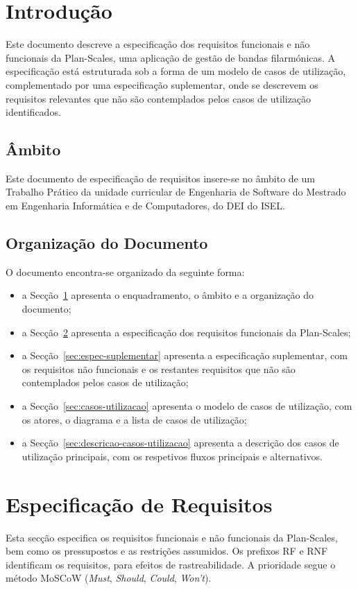 


\section{Introdução}
\label{sec:introducao}
Este documento descreve a especificação dos requisitos funcionais e não funcionais da Plan-Scales, uma aplicação de gestão de bandas filarmónicas. A especificação está estruturada sob a forma de um modelo de casos de utilização, complementado por uma especificação suplementar, onde se descrevem os requisitos relevantes que não são contemplados pelos casos de utilização identificados.

\subsection{Âmbito}
Este documento de especificação de requisitos insere-se no âmbito de um Trabalho Prático da unidade curricular de Engenharia de Software do Mestrado em Engenharia Informática e de Computadores, do DEI do ISEL.

\subsection{Organização do Documento}
O documento encontra-se organizado da seguinte forma:
\begin{itemize}
  \item a Secção~\ref{sec:introducao} apresenta o enquadramento, o âmbito e a organização do documento;
  \item a Secção~\ref{sec:requisitos} apresenta a especificação dos requisitos funcionais da Plan-Scales;
  \item a Secção~\ref{sec:espec-suplementar} apresenta a especificação suplementar, com os requisitos não funcionais e os restantes requisitos que não são contemplados pelos casos de utilização;
  \item a Secção~\ref{sec:casos-utilizacao} apresenta o modelo de casos de utilização, com os atores, o diagrama e a lista de casos de utilização;
  \item a Secção~\ref{sec:descricao-casos-utilizacao} apresenta a descrição dos casos de utilização principais, com os respetivos fluxos principais e alternativos.
\end{itemize}
\pagebreak


\section{Especificação de Requisitos}
\label{sec:requisitos}
Esta secção especifica os requisitos funcionais e não funcionais da Plan-Scales, bem como os pressupostos e as restrições assumidos. Os prefixos RF e RNF identificam os requisitos, para efeitos de rastreabilidade. A prioridade segue o método MoSCoW (\textit{Must}, \textit{Should}, \textit{Could}, \textit{Won't}).

